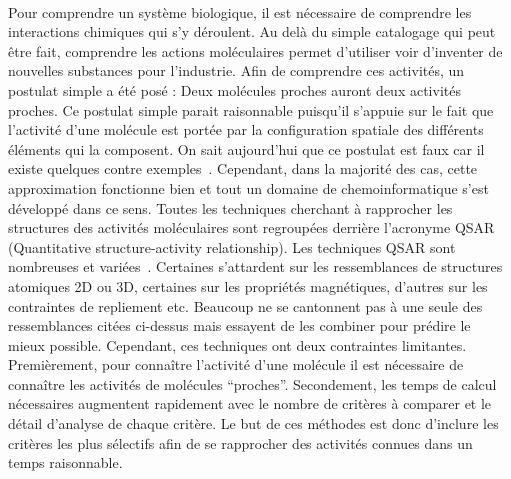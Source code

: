 \documentclass[12pt,french,twoside]{report}
\begin{document}
\paragraph{}Pour comprendre un système biologique, il est nécessaire de comprendre les interactions chimiques qui s'y déroulent.
Au delà du simple catalogage qui peut être fait, comprendre les actions moléculaires permet d'utiliser voir d'inventer de nouvelles substances pour l'industrie.
Afin de comprendre ces activités, un postulat simple a été posé : Deux molécules proches auront deux activités proches.
Ce postulat simple parait raisonnable puisqu'il s'appuie sur le fait que l'activité d'une molécule est portée par la configuration spatiale des différents éléments qui la composent.
On sait aujourd'hui que ce postulat est faux car il existe quelques contre exemples~\cite{patani_bioisosterism:_1996}.
Cependant, dans la majorité des cas, cette approximation fonctionne bien et tout un domaine de chemoinformatique s'est développé dans ce sens.
Toutes les techniques cherchant à rapprocher les structures des activités moléculaires sont regroupées derrière l'acronyme QSAR (Quantitative structure-activity relationship).
Les techniques QSAR sont nombreuses et variées~\cite{patani_bioisosterism:_1996,leach_molecular_2001,helma_predictive_2005}.
Certaines s'attardent sur les ressemblances de structures atomiques 2D ou 3D, certaines sur les propriétés magnétiques, d'autres sur les contraintes de repliement etc.
Beaucoup ne se cantonnent pas à une seule des ressemblances citées ci-dessus mais essayent de les combiner pour prédire le mieux possible.
Cependant, ces techniques ont deux contraintes limitantes.
Premièrement, pour connaître l'activité d'une molécule il est nécessaire de connaître les activités de molécules ``proches''.
Secondement, les temps de calcul nécessaires augmentent rapidement avec le nombre de critères à comparer et le détail d'analyse de chaque critère.
Le but de ces méthodes est donc d'inclure les critères les plus sélectifs afin de se rapprocher des activités connues dans un temps raisonnable.
\end{document}

